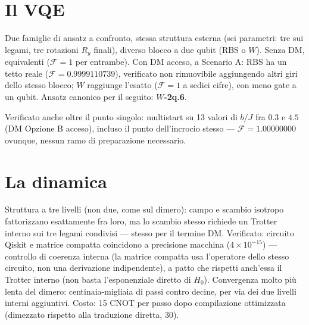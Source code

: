 \documentclass[11pt,a4paper]{article}
\begin{document}

\section{Il VQE}

Due famiglie di ansatz a confronto, stessa struttura esterna (sei
parametri: tre sui legami, tre rotazioni $R_y$ finali), diverso blocco a
due qubit (RBS o $W$). Senza DM, equivalenti ($\mathcal F=1$ per entrambe).
Con DM acceso, a Scenario A: RBS ha un tetto reale ($\mathcal
F=0.9999110739$), verificato non rimuovibile aggiungendo altri giri dello
stesso blocco; $W$ raggiunge l'esatto ($\mathcal F=1$ a sedici cifre), con
meno gate a un qubit. Ansatz canonico per il seguito: \textbf{$W$-2q.6}.

Verificato anche oltre il punto singolo: multistart su 13 valori di $b/J$
fra $0.3$ e $4.5$ (DM Opzione B acceso), incluso il punto dell'incrocio
stesso --- $\mathcal F=1.00000000$ ovunque, nessun ramo di preparazione
necessario.


\section{La dinamica}

Struttura a tre livelli (non due, come sul dimero): campo e scambio isotropo
fattorizzano esattamente fra loro, ma lo scambio stesso richiede un Trotter
interno sui tre legami condivisi --- stesso per il termine DM. Verificato:
circuito Qiskit e matrice compatta coincidono a precisione macchina
($4\times10^{-15}$) --- controllo di coerenza interna (la matrice compatta
usa l'operatore dello stesso circuito, non una derivazione indipendente),
a patto che rispetti anch'essa il Trotter interno (non basta
l'esponenziale diretto di $H_0$). Convergenza
molto più lenta del dimero: centinaia-migliaia di passi contro decine, per
via dei due livelli interni aggiuntivi. Costo: 15 CNOT per passo dopo
compilazione ottimizzata (dimezzato rispetto alla traduzione diretta, 30).
\end{document}
